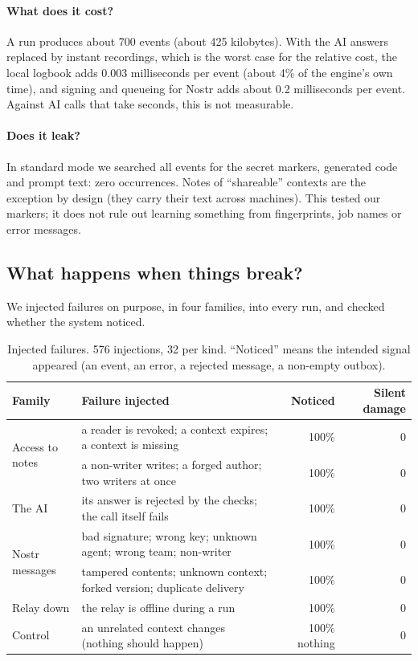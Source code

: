 \documentclass[10pt,a4paper]{article}
\begin{document}
\paragraph{What does it cost?} A run produces about 700 events (about 425 kilobytes). With the AI answers
replaced by instant recordings, which is the worst case for the relative cost, the local logbook adds
0.003 milliseconds per event (about 4\% of the engine's own time), and signing and queueing for Nostr adds about
0.2 milliseconds per event. Against AI calls that take seconds, this is not measurable.

\paragraph{Does it leak?} In standard mode we searched all events for the secret markers, generated code and
prompt text: zero occurrences. Notes of ``shareable'' contexts are the exception by design (they carry their
text across machines). This tested our markers; it does not rule out learning something from fingerprints, job
names or error messages.

\subsection{What happens when things break?}

We injected failures on purpose, in four families, into every run, and checked whether the system noticed.

\begin{table}[h]
\centering\small
\caption{Injected failures. 576 injections, 32 per kind. ``Noticed'' means the intended signal appeared (an event, an
error, a rejected message, a non-empty outbox).}
\label{tab:faults}
\begin{tabular}{@{}l p{8.2cm} r r@{}}
\toprule
Family & Failure injected & Noticed & Silent damage \\
\midrule
\multirow{2}{*}{Access to notes} & a reader is revoked; a context expires; a context is missing & 100\% & 0 \\
 & a non-writer writes; a forged author; two writers at once & 100\% & 0 \\
\midrule
The AI & its answer is rejected by the checks; the call itself fails & 100\% & 0 \\
\midrule
\multirow{2}{*}{Nostr messages} & bad signature; wrong key; unknown agent; wrong team; non-writer & 100\% & 0 \\
 & tampered contents; unknown context; forked version; duplicate delivery & 100\% & 0 \\
\midrule
Relay down & the relay is offline during a run & 100\% & 0 \\
\midrule
Control & an unrelated context changes (nothing should happen) & 100\% nothing & 0 \\
\bottomrule
\end{tabular}
\end{table}
\end{document}
